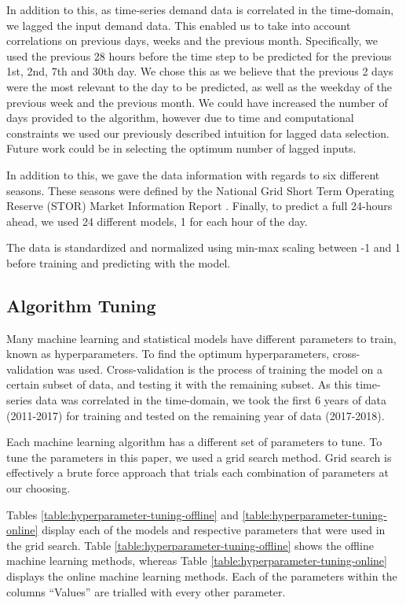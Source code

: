 \documentclass[final,3p,times,twocolumn,numbers]{elsarticle}
\begin{document}
In addition to this, as time-series demand data is correlated in the time-domain, we lagged the input demand data. This enabled us to take into account correlations on previous days, weeks and the previous month. Specifically, we used the previous 28 hours before the time step to be predicted for the previous 1st, 2nd, 7th and 30th day. We chose this as we believe that the previous 2 days were the most relevant to the day to be predicted, as well as the weekday of the previous week and the previous month. We could have increased the number of days provided to the algorithm, however due to time and computational constraints we used our previously described intuition for lagged data selection. Future work could be in selecting the optimum number of lagged inputs.

In addition to this, we gave the data information with regards to six different seasons. These seasons were defined by the National Grid Short Term Operating Reserve (STOR) Market Information Report \cite{ESO2019}. Finally, to predict a full 24-hours ahead, we used 24 different models, 1 for each hour of the day. 

The data is standardized and normalized using min-max scaling between -1 and 1 before training and predicting with the model.

\subsection{Algorithm Tuning}

Many machine learning and statistical models have different parameters to train, known as hyperparameters. To find the optimum hyperparameters, cross-validation was used. Cross-validation is the process of training the model on a certain subset of data, and testing it with the remaining subset. As this time-series data was correlated in the time-domain, we took the first 6 years of data (2011-2017) for training and tested on the remaining year of data (2017-2018).

Each machine learning algorithm has a different set of parameters to tune. To tune the parameters in this paper, we used a grid search method. Grid search is effectively a brute force approach that trials each combination of parameters at our choosing.

Tables \ref{table:hyperparameter-tuning-offline} and \ref{table:hyperparameter-tuning-online} display each of the models and respective parameters that were used in the grid search. Table \ref{table:hyperparameter-tuning-offline} shows the offline machine learning methods, whereas Table \ref{table:hyperparameter-tuning-online} displays the online machine learning methods. Each of the parameters within the columns ``Values'' are trialled with every other parameter.
\end{document}
